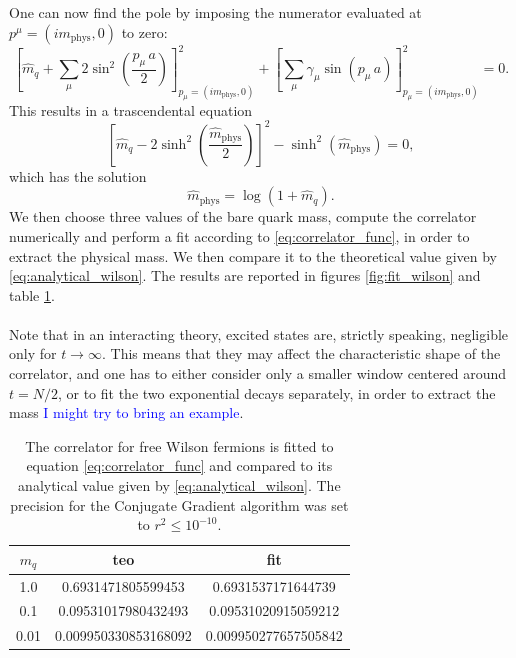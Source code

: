 One can now find the pole by imposing the numerator evaluated at $p^\mu =(im_\text{phys}, 0)$ to zero:
\begin{equation*}
    \left[\hat{m}_q + \sum_\mu 2 \sin ^2\left(\frac{p_\mu \, a}{2}\right)\right]^2_{p_\mu = (im_\text{phys}, 0)} + \left[\sum_\mu \gamma_\mu \sin \left(p_\mu \, a\right)\right]^2_{p_\mu = (im_\text{phys}, 0)} = 0.
\end{equation*}
This results in a trascendental equation 
\begin{equation*}
    \left[\hat{m}_q - 2 \sinh^2\left(\frac{\hat{m}_\text{phys}}{2}\right)\right]^2 - \sinh^2\left(\hat{m}_\text{phys}\right) = 0,
\end{equation*}
which has the solution 
\begin{equation}
    \hat{m}_\text{phys} = \log\left(1+\hat{m}_q\right).
    \label{eq:analytical_wilson}
\end{equation}
We then choose three values of the bare quark mass, compute the correlator numerically and perform a fit according to \eqref{eq:correlator_func}, in order to extract the physical mass. We then compare it to the theoretical value given by \eqref{eq:analytical_wilson}. The results are reported in figures \ref{fig:fit_wilson} and table \ref{tab:free_wilson_fit}. \\~\\
Note that in an interacting theory, excited states are, strictly speaking, negligible only for $t \to \infty$. This means that they may affect the characteristic shape of the correlator, and one has to either consider only a smaller window centered around $t=N/2$, or to fit the two exponential decays separately, in order to extract the mass \textcolor{blue}{I might try to bring an example}.
\newpage
\begin{table}[h!]
    \centering
    \begin{tabular}[pos]{ccc}
        \toprule
        $m_q$ & teo & fit \\
        \midrule 
        1.0 & 0.6931471805599453 & 0.6931537171644739 \\
        0.1 & 0.09531017980432493 & 0.09531020915059212 \\
        0.01 & 0.009950330853168092 & 0.009950277657505842 \\
        \bottomrule
    \end{tabular}
    \caption[Fit of the correlator for free Wilson fermions.]{The correlator for free Wilson fermions is fitted to equation \eqref{eq:correlator_func} and compared to its analytical value given by \eqref{eq:analytical_wilson}. The precision for the Conjugate Gradient algorithm was set to $r^2 \leq 10^{-10}$.}
    \label{tab:free_wilson_fit}
\end{table}
